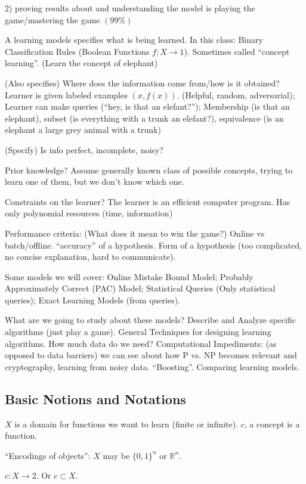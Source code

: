 \documentclass[10pt]{article}
\newcommand{\R}{\mathbb{R}}
\begin{document}
2) proving results about and understanding the model is playing the game/mastering the game \((99\%)\)

A learning models specifies what is being learned. In this class: Binary Classification Rules (Boolean Functions \(f: X \to 1\)). Sometimes called ``concept learning''. (Learn the concept of elephant)

(Also specifies) Where does the information come from/how is it obtained? Learner is given labeled examples \((x, f(x))\). (Helpful, random, adversarial); Learner can make queries (``hey, is that an elefant?''); Membership (is that an elephant), subset (is everything with a trunk an elefant?), equivalence (is an elephant a large grey animal with a trunk)

(Specify) Is info perfect, incomplete, noisy?

Prior knowledge? Assume generally known class of possible concepts, trying to learn one of them, but we don't know which one. 

Constraints on the learner? The learner is an efficient computer program. Has only polynomial resources (time, information)

Performance criteria: (What does it mean to win the game?) Online vs batch/offline. 
``accuracy'' of a hypothesis. Form of a hypothesis (too complicated, no concise explanation, hard to communicate). 

Some models we will cover: Online Mistake Bound Model; Probably Approximately Correct (PAC) Model; Statistical Queries (Only statistical queries); Exact Learning Models (from queries). 

What are we going to study about these models? Describe and Analyze specific algorithms (just play a game). General Techniques for designing learning algorithms. How much data do we need? Computational Impediments: (as opposed to data barriers) we can see about how P vs. NP becomes relevant and cryptography, learning from noisy data. ``Boosting''. Comparing learning models. 

\subsection{Basic Notions and Notations}

\(X\) is a domain for functions we want to learn (finite or infinite). \(c\), a concept is a function. 

``Encodings of objects'': \(X\) may be \(\{0, 1\}^n\) or \(\R^n\).  

\(c: X \to 2\). Or \(c \subset X\).
\end{document}
